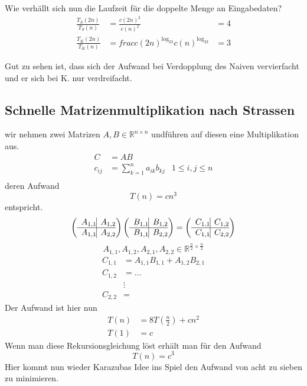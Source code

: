 \documentclass[a4paper,twoside,10pt]{report}
\begin{document}
Wie verhällt sich nun die Laufzeit für die doppelte Menge an Eingabedaten?
\begin{align*}
\frac{T_S(2n)}{T_S(n)}&=\frac{c(2n)^2}{c(n)^2}&=4\\
\frac{T_K(2n)}{T_K(n)}&=frac{c(2n)^{\log_23}}{c(n)^{\log_23}}&=3
\end{align*}

Gut zu sehen ist, dass sich der Aufwand bei Verdopplung des Naiven vervierfacht und er sich bei K. nur verdreifacht.
\subsection{Schnelle Matrizenmultiplikation nach Strassen}

wir nehmen zwei Matrizen $A,B\in \mathbb R^{n\times n}$ und\linebreak führen auf diesen eine Multiplikation aus.
\begin{align*}C&=AB\\
c_{ij}&=\sum_{k=1}^na_{ik}b_{kj} &1\le i,j \le n\\
\end{align*}
deren Aufwand
$$T(n)=cn^3$$
entspricht.
\[\left(\begin{array}{c@{ }|c@{ }}
A_{1,1} & A_{1,2} \\\hline
A_{1,1} &A_{2,2}
\end{array}\right)\left(\begin{array}{c@{ }|c@{ }}
B_{1,1} & B_{1,2} \\\hline
B_{1,1} &B_{2,2}
\end{array}\right)=\left(\begin{array}{c@{ }|c@{ }}
C_{1,1} & C_{1,2} \\\hline
C_{1,1} &C_{2,2}
\end{array}\right)\]
$$A_{1,1},A_{1,2},A_{2,1},A_{2,2}\in \mathbb R^{\frac{n}{2}\times\frac{n}{2}}$$
\begin{align*}
C_{1,1}&=A_{1,1}B_{1,1}+A_{1,2}B_{2,1}\\
C_{1,2}&=\ldots\\
&\vdots\\
C_{2,2}&=
\end{align*}
Der Aufwand ist hier nun
\begin{align*}T(n)&=8T\left(\frac{n}{2}\right)+cn^2\\
T(1)&=c
\end{align*}
Wenn man diese Rekursionsgleichung löst erhält man für den Aufwand $$T(n)=c^3$$
Hier kommt nun wieder Karazubas Idee ins Spiel den Aufwand von acht zu sieben zu minimieren.
\end{document}
